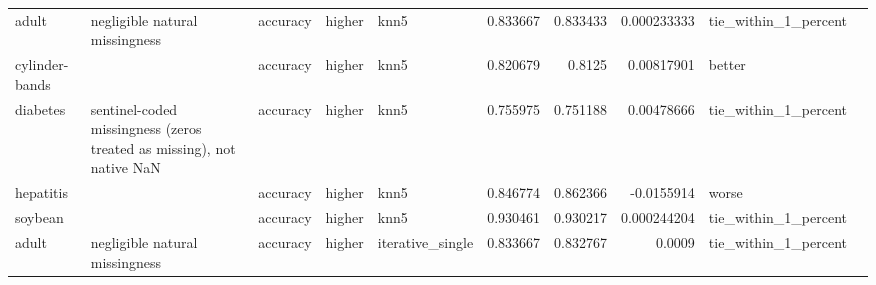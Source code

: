 \begin{table}[ht]
{\begin{tabular}{lllllrrrll}
 adult          & negligible natural missingness                                        & accuracy                       & higher             & knn5             &                   0.833667 &               0.833433 &                     0.000233333 & tie\_within\_1\_percent &                                                                                                                    \\
 cylinder-bands &                                                                       & accuracy                       & higher             & knn5             &                   0.820679 &               0.8125   &                     0.00817901  & better               &                                                                                                                    \\
 diabetes       & sentinel-coded missingness (zeros treated as missing), not native NaN & accuracy                       & higher             & knn5             &                   0.755975 &               0.751188 &                     0.00478666  & tie\_within\_1\_percent &                                                                                                                    \\
 hepatitis      &                                                                       & accuracy                       & higher             & knn5             &                   0.846774 &               0.862366 &                    -0.0155914   & worse                &                                                                                                                    \\
 soybean        &                                                                       & accuracy                       & higher             & knn5             &                   0.930461 &               0.930217 &                     0.000244204 & tie\_within\_1\_percent &                                                                                                                    \\
 adult          & negligible natural missingness                                        & accuracy                       & higher             & iterative\_single &                   0.833667 &               0.832767 &                     0.0009      & tie\_within\_1\_percent &                                                                                                                    \\

\end{tabular}}
\end{table}
